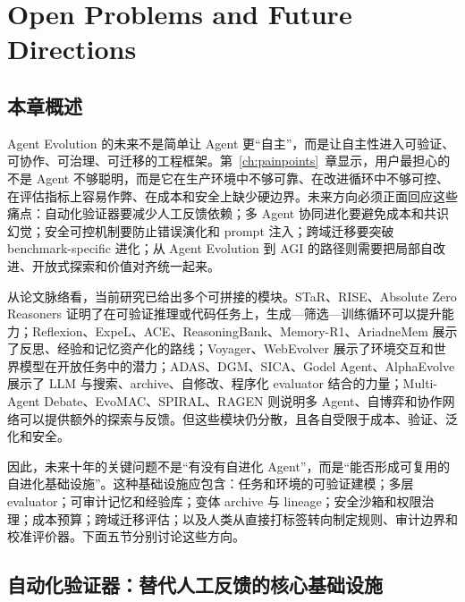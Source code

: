 
\section{Open Problems and Future Directions}\label{ch:future}

\subsection{本章概述}\label{sec:ch8-overview}

Agent Evolution 的未来不是简单让 Agent 更``自主''，而是让自主性进入可验证、可协作、可治理、可迁移的工程框架。第~\ref{ch:painpoints}~章显示，用户最担心的不是 Agent 不够聪明，而是它在生产环境中不够可靠、在改进循环中不够可控、在评估指标上容易作弊、在成本和安全上缺少硬边界。未来方向必须正面回应这些痛点：自动化验证器要减少人工反馈依赖；多 Agent 协同进化要避免成本和共识幻觉；安全可控机制要防止错误演化和 prompt 注入；跨域迁移要突破 benchmark-specific 进化；从 Agent Evolution 到 AGI 的路径则需要把局部自改进、开放式探索和价值对齐统一起来。

从论文脉络看，当前研究已给出多个可拼接的模块。STaR、RISE、Absolute Zero Reasoners 证明了在可验证推理或代码任务上，生成---筛选---训练循环可以提升能力；Reflexion、ExpeL、ACE、ReasoningBank、Memory-R1、AriadneMem 展示了反思、经验和记忆资产化的路线；Voyager、WebEvolver 展示了环境交互和世界模型在开放任务中的潜力；ADAS、DGM、SICA、Godel Agent、AlphaEvolve 展示了 LLM 与搜索、archive、自修改、程序化 evaluator 结合的力量；Multi-Agent Debate、EvoMAC、SPIRAL、RAGEN 则说明多 Agent、自博弈和协作网络可以提供额外的探索与反馈。但这些模块仍分散，且各自受限于成本、验证、泛化和安全。

因此，未来十年的关键问题不是``有没有自进化 Agent''，而是``能否形成可复用的自进化基础设施''。这种基础设施应包含：任务和环境的可验证建模；多层 evaluator；可审计记忆和经验库；变体 archive 与 lineage；安全沙箱和权限治理；成本预算；跨域迁移评估；以及人类从直接打标签转向制定规则、审计边界和校准评价器。下面五节分别讨论这些方向。

\subsection{自动化验证器：替代人工反馈的核心基础设施}\label{sec:ch8-verifier}

